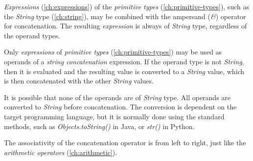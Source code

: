 \emph{Expressions} (\ref{ch:expressions}) of
the \emph{primitive types} (\ref{ch:primitive-types}),
such as the \emph{String} type (\ref{ch:string}),
may be combined with the ampersand (\emph{\&}) operator
for concatenation.
The resulting \emph{expression} is always of \emph{String} type,
regardless of the operand types.

Only \emph{expressions} of \emph{primitive types} (\ref{ch:primitive-types})
may be used as operands of a \emph{string concatenation} expression.
If the operand type is not \emph{String},
then it is evaluated and the resulting value is converted to a \emph{String} value,
which is then concatenated with the other \emph{String} values.

It is possible that none of the operands are of \emph{String} type.
All operands are converted to \emph{String} before concatenation.
The conversion is dependent on the target programming language,
but it is normally done using the standard methods,
such as \emph{Objects.toString()} in Java, or \emph{str()} in Python.

The associativity of the concatenation operator is from left to right,
just like the \emph{arithmetic operators} (\ref{ch:arithmetic}).
